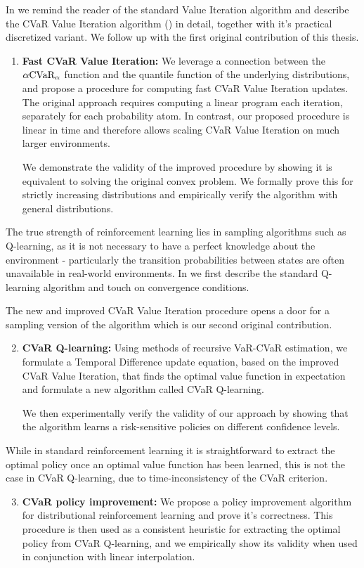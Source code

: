In  we remind the reader of the standard Value Iteration algorithm and describe the CVaR Value Iteration algorithm (\citet{chow2015risk}) in detail, together with it's practical discretized variant. We follow up with the first original contribution of this thesis.
\begin{enumerate}
\item \textbf{Fast CVaR Value Iteration:} We leverage a connection between the $\alpha\text{CVaR}_\alpha$ function and the quantile function of the underlying distributions, and propose a procedure for computing fast CVaR Value Iteration updates. The original approach requires computing a linear program each iteration, separately for each probability atom. In contrast, our proposed procedure is linear in time and therefore allows scaling CVaR Value Iteration on much larger environments.

We demonstrate the validity of the improved procedure by showing it is equivalent to solving the original convex problem. We formally prove this for strictly increasing distributions and empirically verify the algorithm with general distributions.
\end{enumerate}

The true strength of reinforcement learning lies in sampling algorithms such as Q-learning, as it is not necessary to have a perfect knowledge about the environment - particularly the transition probabilities between states are often unavailable in real-world environments. In  we first describe the standard Q-learning algorithm and touch on convergence conditions. 

The new and improved CVaR Value Iteration procedure opens a door for a sampling version of the algorithm which is our second original contribution.
\begin{enumerate}
\setcounter{enumi}{1}
\item \textbf{CVaR Q-learning:} Using methods of recursive VaR-CVaR estimation, we formulate a Temporal Difference update equation, based on the improved CVaR Value Iteration, that finds the optimal value function in expectation and formulate a new algorithm called CVaR Q-learning.

We then experimentally verify the validity of our approach by showing that the algorithm learns a risk-sensitive policies on different confidence levels.
\end{enumerate}

While in standard reinforcement learning it is straightforward to extract the optimal policy once an optimal value function has been learned, this is not the case in CVaR Q-learning, due to time-inconsistency of the CVaR criterion.
\begin{enumerate}
\setcounter{enumi}{2}
\item \textbf{CVaR policy improvement:} We propose a policy improvement algorithm for distributional reinforcement learning and prove it's correctness. This procedure is then used as a consistent heuristic for extracting the optimal policy from CVaR Q-learning, and we empirically show its validity when used in conjunction with linear interpolation.
\end{enumerate}

